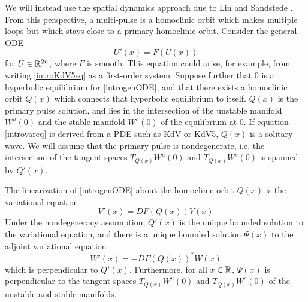 \documentclass[thesis2.tex]{subfiles}
\begin{document}
We will instead use the spatial dynamics approach due to Lin \cite{Lin1990} and Sandstede \cite{Sandstede1993,SandstedeStrut}. From this perspective, a multi-pulse is a homoclinic orbit which makes multiple loops but which stays close to a primary homoclinic orbit. Consider the general ODE
\begin{equation}\label{introgenODE}
U'(x) = F(U(x))
\end{equation}
for $U \in \mathbb{R}^{2n}$, where $F$ is smooth. This equation could arise, for example, from writing 
\cref{introKdV5eq} as a first-order system. Suppose further that 0 is a hyperbolic equilibrium for \cref{introgenODE}, and that there exists a homoclinic orbit $Q(x)$ which connects that hyperbolic equilibrium to itself. $Q(x)$ is the primary pulse solution, and lies in the intersection of the unstable manifold $W^u(0)$ and the stable manifold $W^s(0)$ of the equilibrium at 0. If equation \cref{introvareq} is derived from a PDE such as KdV or KdV5, $Q(x)$ is a solitary wave. We will assume that the primary pulse is nondegenerate, i.e. the intersection of the tangent spaces $T_{Q(x)}W^u(0)$ and $T_{Q(x)}W^s(0)$ is spanned by $Q'(x)$.

The linearization of \cref{introgenODE} about the homoclinic orbit $Q(x)$ is the variational equation
\begin{equation}\label{introvareq}
V'(x) = DF(Q(x)) V(x)
\end{equation}
Under the nondegeneracy assumption, $Q'(x)$ is the unique bounded solution to the variational equation, and there is a unique bounded solution $\Psi(x)$ to the adjoint variational equation
\begin{equation}\label{introadjvareq}
W'(x) = -DF(Q(x))^* W(x)
\end{equation}
which is perpendicular to $Q'(x)$. Furthermore, for all $x \in \mathbb{R}$, $\Psi(x)$ is perpendicular to the tangent spaces $T_{Q(x)}W^u(0)$ and $T_{Q(x)}W^s(0)$ of the unstable and stable manifolds. 
\end{document}

